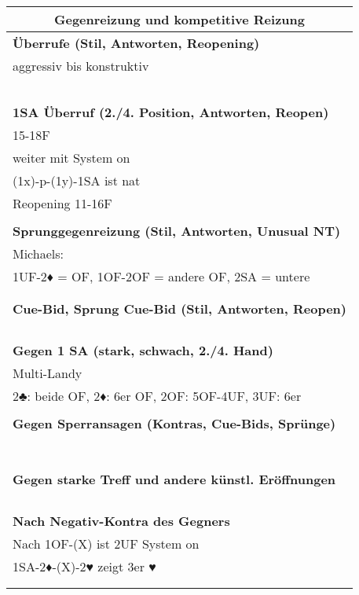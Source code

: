 \documentclass{article}
\begin{document}
\begin{multicols}{3}
\raggedcolumns

\begin{tabularx}{\columnwidth}{|X|}
\hline \multicolumn{1}{|c|}{\bf \large Gegenreizung und kompetitive Reizung} \\
\hline \bf Überrufe (Stil, Antworten, Reopening) \\
 aggressiv bis konstruktiv \\
\\
\\
\\
\\
\\
\hline \bf 1SA Überruf (2./4. Position, Antworten, Reopen) \\
 15-18F \\
 weiter mit System on \\
 (1x)-p-(1y)-1SA ist nat \\
 Reopening 11-16F\\
\\
\hline \bf Sprunggegenreizung (Stil, Antworten, Unusual NT) \\
 Michaels: \\
 1UF-2♦ = OF, 1OF-2OF = andere OF, 2SA = untere \\
\\
\\
\hline \bf Cue-Bid, Sprung Cue-Bid (Stil, Antworten, Reopen) \\
\\
\\
\\
\\
\hline \bf Gegen 1 SA (stark, schwach, 2./4. Hand) \\
 Multi-Landy \\
 2♣: beide OF, 2♦: 6er OF, 2OF: 5OF-4UF, 3UF: 6er \\
\\
\hline \bf Gegen Sperransagen (Kontras, Cue-Bids, Sprünge) \\
\\
\\
\\
\\
\\
\\
\\
\hline \bf Gegen starke Treff und andere künstl. Eröffnungen \\
\\
\\
\\
\\
\hline \bf Nach Negativ-Kontra des Gegners \\
 Nach 1OF-(X) ist 2UF System on \\
 1SA-2♦-(X)-2♥ zeigt 3er ♥ \\
\\
\\
\hline \end{tabularx}


\end{multicols}
\end{document}
